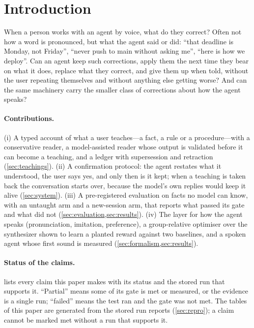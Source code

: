
\section{Introduction}\label{sec:intro}

When a person works with an agent by voice, what do they correct? Often not how a word is pronounced, but what the agent said or did: ``that deadline is
Monday, not Friday'', ``never push to main without asking me'', ``here is how we deploy''. Can an agent keep such corrections, apply them
the next time they bear on what it does, replace what they correct, and give them up when told, without the user repeating themselves and
without anything else getting worse? And can the same machinery carry the smaller class of corrections about how the agent speaks?

\paragraph{Contributions.}
(i) A typed account of what a user teaches---a fact, a rule or a procedure---with a conservative reader, a model-assisted reader whose output is validated before it can become a teaching, and a ledger with supersession and retraction (\cref{sec:teachings}).
(ii) A confirmation protocol: the agent restates what it understood, the user says yes, and only then is it kept; when a teaching is taken back the conversation starts over, because the model's own replies would keep it alive (\cref{sec:system}).
(iii) A pre-registered evaluation on facts no model can know, with an untaught arm and a new-session arm, that reports what passed its gate and what did not
(\cref{sec:evaluation,sec:results}).
(iv) The layer for how the agent speaks (pronunciation, imitation, preference), a group-relative optimiser over the synthesizer shown to learn a planted
reward against two baselines, and a spoken agent whose first sound is measured (\cref{sec:formalism,sec:results}).

\paragraph{Status of the claims.}
 lists every claim this paper makes with its status and the stored run that supports it. ``Partial'' means some of its gate is met or measured, or
the evidence is a single run; ``failed'' means the test ran and the gate was not met. The tables of this paper are generated from the stored run reports
(\cref{sec:repro}); a claim cannot be marked met without a run that supports it.

